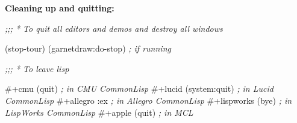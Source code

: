 {\bf Cleaning up and quitting:}
\begin{programexample}
{\it ;;; * To quit all editors and demos and destroy all windows}

(stop-tour)
(garnetdraw:do-stop)   {\it ; if running}

{\it ;;; * To leave lisp}

\#+cmu   (quit)         {\it ; in CMU CommonLisp}
\#+lucid (system:quit)  {\it ; in Lucid CommonLisp}
\#+allegro :ex          {\it ; in Allegro CommonLisp}
\#+lispworks (bye)      {\it ; in LispWorks CommonLisp}
\#+apple (quit)         {\it ; in MCL}

\end{programexample}


% 
% 
% 
% 
% 
% 
% 
% 
% 
% 
% 
% 
